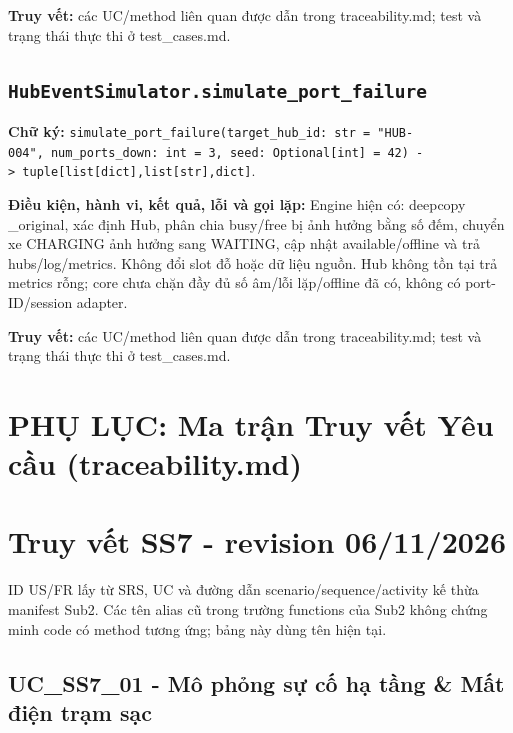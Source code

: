 \documentclass[11pt,a4paper]{article}
\begin{document}
\textbf{Truy vết:} các UC/method liên quan được dẫn trong
traceability.md; test và trạng thái thực thi ở test\_cases.md.

\hypertarget{hubeventsimulator.simulate_port_failure}{%
\subsection{\texorpdfstring{\texttt{HubEventSimulator.simulate\_port\_failure}}{HubEventSimulator.simulate\_port\_failure}}\label{hubeventsimulator.simulate_port_failure}}

\textbf{Chữ ký:}
\texttt{simulate\_port\_failure(target\_hub\_id:\ str\ =\ "HUB-004",\ num\_ports\_down:\ int\ =\ 3,\ seed:\ Optional{[}int{]}\ =\ 42)\ -\textgreater{}\ tuple{[}list{[}dict{]},list{[}str{]},dict{]}}.

\textbf{Điều kiện, hành vi, kết quả, lỗi và gọi lặp:} Engine hiện có:
deepcopy \_original, xác định Hub, phân chia busy/free bị ảnh hưởng bằng
số đếm, chuyển xe CHARGING ảnh hưởng sang WAITING, cập nhật
available/offline và trả hubs/log/metrics. Không đổi slot đỗ hoặc dữ
liệu nguồn. Hub không tồn tại trả metrics rỗng; core chưa chặn đầy đủ số
âm/lỗi lặp/offline đã có, không có port-ID/session adapter.

\textbf{Truy vết:} các UC/method liên quan được dẫn trong
traceability.md; test và trạng thái thực thi ở test\_cases.md.

\newpage
\section*{PHỤ LỤC: Ma trận Truy vết Yêu cầu (traceability.md)}
\hypertarget{truy-vux1ebft-ss7---revision-06112026}{%
\section{Truy vết SS7 - revision
06/11/2026}\label{truy-vux1ebft-ss7---revision-06112026}}

ID US/FR lấy từ SRS, UC và đường dẫn scenario/sequence/activity kế thừa
manifest Sub2. Các tên alias cũ trong trường functions của Sub2 không
chứng minh code có method tương ứng; bảng này dùng tên hiện tại.

\hypertarget{uc_ss7_01---muxf4-phux1ecfng-sux1ef1-cux1ed1-hux1ea1-tux1ea7ng-mux1ea5t-ux111iux1ec7n-trux1ea1m-sux1ea1c}{%
\subsection{UC\_SS7\_01 - Mô phỏng sự cố hạ tầng \& Mất điện trạm
sạc}\label{uc_ss7_01---muxf4-phux1ecfng-sux1ef1-cux1ed1-hux1ea1-tux1ea7ng-mux1ea5t-ux111iux1ec7n-trux1ea1m-sux1ea1c}}
\end{document}
